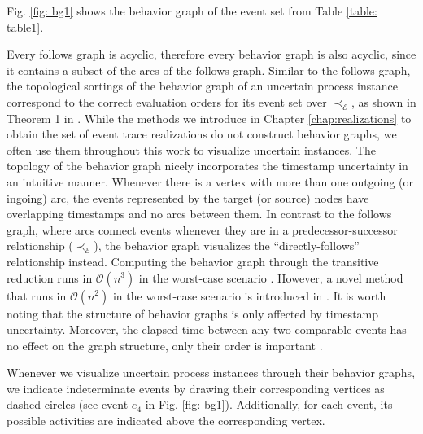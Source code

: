 Fig. \ref{fig: bg1} shows the behavior graph of the event set from Table \ref{table: table1}.

Every follows graph is acyclic, therefore every behavior graph is also acyclic, since it contains a subset of the arcs of the follows graph.
Similar to the follows graph, the topological sortings of the behavior graph of an uncertain process instance correspond to the correct evaluation orders for its event set over $\prec_{\mathcal{E}}$, as shown in Theorem 1 in \cite{conformance}.
While the methods we introduce in Chapter \ref{chap:realizations} to obtain the set of event trace realizations do not construct behavior graphs, we often use them throughout this work to visualize uncertain instances.
The topology of the behavior graph nicely incorporates the timestamp uncertainty in an intuitive manner.
Whenever there is a vertex with more than one outgoing (or ingoing) arc, the events represented by the target (or source) nodes have overlapping timestamps and no arcs between them.
In contrast to the follows graph, where arcs connect events whenever they are in a predecessor-successor relationship ($\prec_{\mathcal{E}}$), the behavior graph visualizes the ``directly-follows'' relationship instead.
Computing the behavior graph through the transitive reduction runs in $\mathcal{O}(n^3)$ in the worst-case scenario \cite{transitive}.
However, a novel method that runs in $\mathcal{O}(n^2)$ in the worst-case scenario is introduced in \cite{efficient}.
It is worth noting that the structure of behavior graphs is only affected by timestamp uncertainty.
Moreover, the elapsed time between any two comparable events has no effect on the graph structure, only their order is important \cite{space}.

Whenever we visualize uncertain process instances through their behavior graphs, we indicate indeterminate events by drawing their corresponding vertices as dashed circles (see event $e_4$ in Fig. \ref{fig: bg1}).
Additionally, for each event, its possible activities are indicated above the corresponding vertex.

